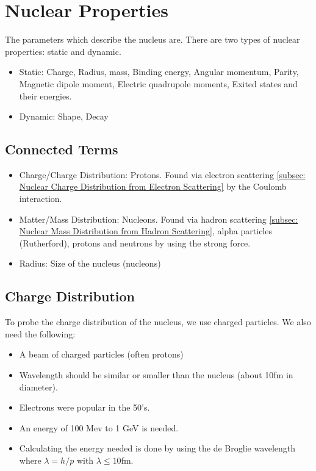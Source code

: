\section{Nuclear Properties}
The parameters which describe the nucleus are. There are two types of nuclear properties: static and dynamic.
\begin{itemize}
    \item Static: Charge, Radius, mass, Binding energy, Angular momentum, Parity, Magnetic dipole moment, Electric quadrupole moments, Exited states and their energies. 
    \item Dynamic: Shape, Decay
\end{itemize}

\subsection{Connected Terms}
\begin{itemize}
    \item Charge/Charge Distribution: Protons. Found via electron scattering \cref{subsec: Nuclear Charge Distribution from Electron Scattering} by the Coulomb interaction. 
    \item Matter/Mass Distribution: Nucleons. Found via hadron scattering \cref{subsec: Nuclear Mass Distribution from Hadron Scattering}, alpha particles (Rutherford), protons and neutrons by using the strong force.
    \item Radius: Size of the nucleus (nucleons)
\end{itemize}

\subsection{Charge Distribution}
To probe the charge distribution of the nucleus, we use charged particles. We also need the following:
\begin{itemize}
    \item A beam of charged particles (often protons)
    \item Wavelength should be similar or smaller than the nucleus (about 10fm in diameter). 
    \item Electrons were popular in the 50's. 
    \item An energy of 100 Mev to 1 GeV is needed.
    \item Calculating the energy needed is done by using the de Broglie wavelength where $λ = h / p$ with $λ ≤ 10$fm. 
\end{itemize}

